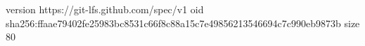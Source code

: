 version https://git-lfs.github.com/spec/v1
oid sha256:ffaae79402fe25983bc8531c66f8c88a15c7e49856213546694c7c990eb9873b
size 80
